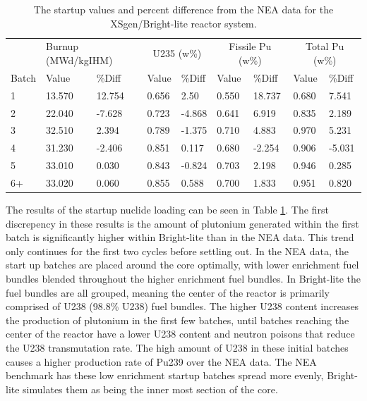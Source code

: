 \documentclass{article}
\begin{document}
\begin{table}[!htb]
\centering
\caption{The startup values and percent difference from the NEA data for the XSgen/Bright-lite reactor system.}
\label{tab:c}
\begin{tabular}{l| ll| ll| ll| ll}
 & \multicolumn{2}{p{1cm}}{Burnup (MWd/kgIHM)} & \multicolumn{2}{c}{U235 (w\%)} & \multicolumn{2}{c}{Fissile Pu (w\%)} & \multicolumn{2}{c}{Total Pu (w\%)} \\
Batch & Value & \%Diff & Value & \%Diff & Value & \%Diff & Value & \%Diff \\
\hline
1 & 13.570 & 12.754 & 0.656 & 2.50 & 0.550 & 18.737 & 0.680 & 7.541 \\
2 & 22.040 & -7.628 & 0.723 & -4.868 & 0.641 & 6.919 & 0.835 & 2.189 \\
3 & 32.510 & 2.394 & 0.789 & -1.375 & 0.710 & 4.883 & 0.970 & 5.231 \\
4 & 31.230 & -2.406 & 0.851 & 0.117 & 0.680 & -2.254 & 0.906 & -5.031 \\
5 & 33.010 & 0.030 & 0.843 & -0.824 & 0.703 & 2.198 & 0.946 & 0.285 \\
6+ & 33.020 & 0.060 & 0.855 & 0.588 & 0.700 & 1.833 & 0.951 & 0.820
\end{tabular}
\end{table}

The results of the startup nuclide loading can be seen in Table \ref{tab:c}.
The first discrepency in these results is the amount of plutonium generated
within the first batch is significantly higher within Bright-lite than in the NEA data.
This trend only continues for the first two cycles before settling out. In the NEA data, the start up batches 
are placed around the core optimally, with lower enrichment fuel bundles blended throughout the 
higher enrichment fuel bundles. In Bright-lite the fuel bundles are all grouped, meaning the center of 
the reactor is primarily comprised of U238 (98.8\% U238) fuel bundles. The higher U238 content
increases the production of plutonium in the first few batches, until batches reaching the center of
the reactor have a lower U238 content and neutron poisons that reduce the U238 transmutation 
rate. 
The high amount of U238 in these initial batches causes a higher production rate of
Pu239 over the NEA data. The NEA benchmark has these low enrichment startup batches
spread more evenly, Bright-lite simulates them as being the inner most section of the core.
\end{document}
